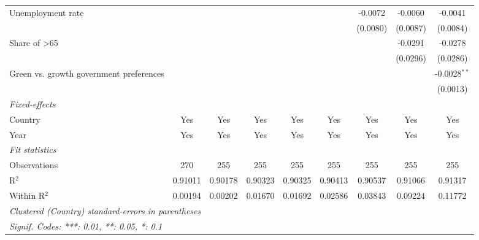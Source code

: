 \begin{table}[htbp]
\begin{tabular}{lcccccccc}
      Unemployment rate                                &          &                       &          &          &          & -0.0072  & -0.0060  & -0.0041\\   
                                                       &          &                       &          &          &          & (0.0080) & (0.0087) & (0.0084)\\   
      Share of >65                                     &          &                       &          &          &          &          & -0.0291  & -0.0278\\   
                                                       &          &                       &          &          &          &          & (0.0296) & (0.0286)\\   
      Green vs. growth government preferences          &          &                       &          &          &          &          &          & -0.0028$^{**}$\\   
                                                       &          &                       &          &          &          &          &          & (0.0013)\\   
      \midrule
      \emph{Fixed-effects}\\
      Country                                          & Yes      & Yes                   & Yes      & Yes      & Yes      & Yes      & Yes      & Yes\\  
      Year                                             & Yes      & Yes                   & Yes      & Yes      & Yes      & Yes      & Yes      & Yes\\  
      \midrule
      \emph{Fit statistics}\\
      Observations                                     & 270      & 255                   & 255      & 255      & 255      & 255      & 255      & 255\\  
      R$^2$                                            & 0.91011  & 0.90178               & 0.90323  & 0.90325  & 0.90413  & 0.90537  & 0.91066  & 0.91317\\  
      Within R$^2$                                     & 0.00194  & 0.00202               & 0.01670  & 0.01692  & 0.02586  & 0.03843  & 0.09224  & 0.11772\\  
      \midrule \midrule
      \multicolumn{9}{l}{\emph{Clustered (Country) standard-errors in parentheses}}\\
      \multicolumn{9}{l}{\emph{Signif. Codes: ***: 0.01, **: 0.05, *: 0.1}}\\
   \end{tabular}
\end{table}


